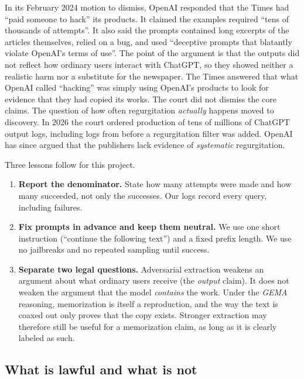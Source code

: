 \documentclass[10pt,a4paper]{article}
\begin{document}
In its February 2024 motion to dismiss, OpenAI responded that the Times had ``paid someone to hack'' its products.
It claimed the examples required ``tens of thousands of attempts''. It also said the prompts contained long excerpts of
the articles themselves, relied on a bug, and used ``deceptive prompts that blatantly violate OpenAI's terms of use''.
The point of the argument is that the outputs did not reflect how ordinary users interact with ChatGPT, so they
showed neither a realistic harm nor a substitute for the newspaper. The Times answered that what OpenAI called
``hacking'' was simply using OpenAI's products to look for evidence that they had copied its works. The court did not
dismiss the core claims. The question of how often regurgitation \emph{actually} happens moved to discovery. In 2026
the court ordered production of tens of millions of ChatGPT output logs, including logs from before a regurgitation
filter was added. OpenAI has since argued that the publishers lack evidence of \emph{systematic} regurgitation.

Three lessons follow for this project.
\begin{enumerate}[label=(\alph*)]
\item \textbf{Report the denominator.} State how many attempts were made and how many succeeded, not only the
successes. Our logs record every query, including failures.
\item \textbf{Fix prompts in advance and keep them neutral.} We use one short instruction (``continue the following
text'') and a fixed prefix length. We use no jailbreaks and no repeated sampling until success.
\item \textbf{Separate two legal questions.} Adversarial extraction weakens an argument about what ordinary users
receive (the \emph{output} claim). It does not weaken the argument that the model \emph{contains} the work. Under the
\emph{GEMA} reasoning, memorization is itself a reproduction, and the way the text is coaxed out only proves that the
copy exists. Stronger extraction may therefore still be useful for a memorization claim, as long as it is clearly
labeled as such.
\end{enumerate}

\subsection{What is lawful and what is not}\label{sec:lawful}
\end{document}

